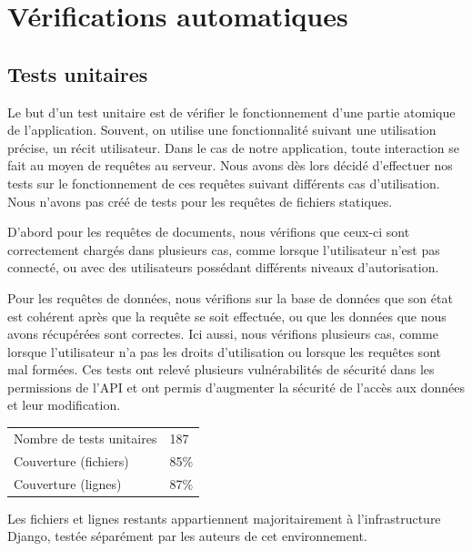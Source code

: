 \documentclass{EPL-master-thesis-covers-FR}
\begin{document}
		\section{Vérifications automatiques}


			\subsection*{Tests unitaires}

				Le but d'un test unitaire est de vérifier le fonctionnement d'une partie atomique de l'application. Souvent, on utilise une fonctionnalité suivant une utilisation précise, un récit utilisateur. Dans le cas de notre application, toute interaction se fait au moyen de requêtes au serveur. Nous avons dès lors décidé d'effectuer nos tests sur le fonctionnement de ces requêtes suivant différents cas d'utilisation. Nous n'avons pas créé de tests pour les requêtes de fichiers statiques.

				D'abord pour les requêtes de documents, nous vérifions que ceux-ci sont correctement chargés dans plusieurs cas, comme lorsque l'utilisateur n'est pas connecté, ou avec des utilisateurs possédant différents niveaux d'autorisation.

				Pour les requêtes de données, nous vérifions sur la base de données que son état est cohérent après que la requête se soit effectuée, ou que les données que nous avons récupérées sont correctes. Ici aussi, nous vérifions plusieurs cas, comme lorsque l'utilisateur n'a pas les droits d'utilisation ou lorsque les requêtes sont mal formées. Ces tests ont relevé plusieurs vulnérabilités de sécurité dans les permissions de l'API et ont permis d'augmenter la sécurité de l'accès aux données et leur modification.

				\begin{tabular}{l|l}
				   Nombre de tests unitaires & 187 \\
				   Couverture (fichiers) & 85\% \\
				   Couverture (lignes) & 87\% \\
				\end{tabular}

				Les fichiers et lignes restants appartiennent majoritairement à l'infrastructure Django, testée séparément par les auteurs de cet environnement.

\end{document}
